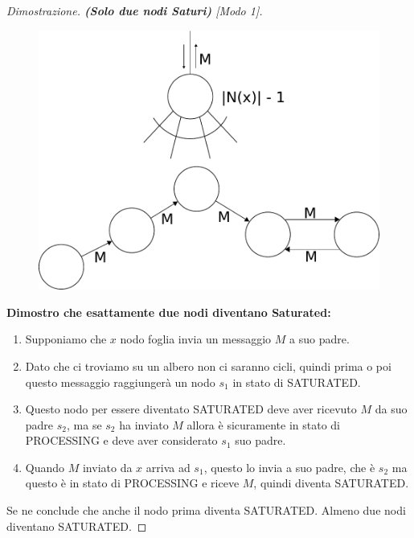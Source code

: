 \begin{proof}[Dimostrazione. \textbf{(Solo due nodi Saturi)} \textit{[Modo 1]}]\
    \begin{figure}[H]
        \centering
        \includegraphics[scale=0.5]{capitoli/saturazione/imgs/n_40}
    \end{figure}

    \textbf{Dimostro che esattamente due nodi diventano Saturated:}
    \begin{enumerate}
        \item Supponiamo che $x$ nodo foglia invia un messaggio $M$ a suo
              padre.
        \item Dato che ci troviamo su un albero non ci saranno cicli, quindi
              prima o poi questo messaggio raggiungerà un nodo $s_1$ in stato di
              SATURATED.
        \item Questo nodo per essere diventato SATURATED deve aver ricevuto
              $M$ da suo padre $s_2$, ma se $s_2$ ha inviato $M$ allora è
              sicuramente in stato di PROCESSING e deve aver considerato
              $s_1$ suo padre.
        \item Quando $M$ inviato da $x$ arriva ad $s_1$, questo lo invia a suo
              padre, che è $s_2$ ma questo è in stato di PROCESSING e riceve $M$,
              quindi diventa SATURATED.
    \end{enumerate}

    Se ne conclude che anche il nodo prima diventa SATURATED. Almeno due
    nodi diventano SATURATED.
\end{proof}

